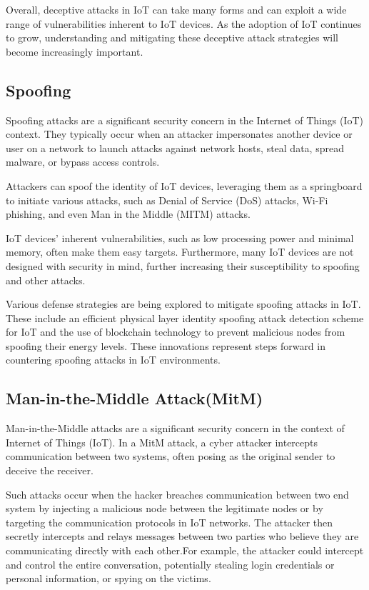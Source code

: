 Overall, deceptive attacks in IoT can take many forms and can exploit a wide range of vulnerabilities inherent to IoT devices. As the adoption of IoT continues to grow, understanding and mitigating these deceptive attack strategies will become increasingly important.


\subsection{Spoofing}
Spoofing attacks are a significant security concern in the Internet of Things (IoT) context. They typically occur when an attacker impersonates another device or user on a network to launch attacks against network hosts, steal data, spread malware, or bypass access controls.

Attackers can spoof the identity of IoT devices, leveraging them as a springboard to initiate various attacks, such as Denial of Service (DoS) attacks, Wi-Fi phishing, and even Man in the Middle (MITM) attacks\cite{jiang2020phyalert}.

IoT devices' inherent vulnerabilities, such as low processing power and minimal memory, often make them easy targets. Furthermore, many IoT devices are not designed with security in mind, further increasing their susceptibility to spoofing and other attacks.

Various defense strategies are being explored to mitigate spoofing attacks in IoT. These include an efficient physical layer identity spoofing attack detection scheme for IoT\cite{wang2018efficient} and the use of blockchain technology to prevent malicious nodes from spoofing their energy levels\cite{khan2022energy}. These innovations represent steps forward in countering spoofing attacks in IoT environments.


\subsection{Man-in-the-Middle Attack(MitM)}
Man-in-the-Middle attacks are a significant security concern in the context of Internet of Things (IoT). In a MitM attack, a cyber attacker intercepts communication between two systems, often posing as the original sender to deceive the receiver\cite{globalsign2023}.

Such attacks occur when the hacker breaches communication between two end system by injecting a malicious node between the legitimate nodes or by targeting the communication protocols in IoT networks\cite{sivasankari2022detection}. The attacker then secretly intercepts and relays messages between two parties who believe they are communicating directly with each other.For example, the attacker could intercept and control the entire conversation, potentially stealing login credentials or personal information, or spying on the victims.

